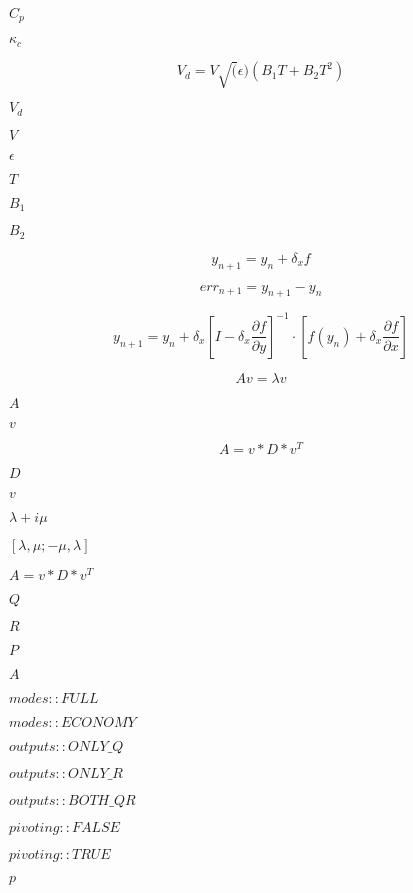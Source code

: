 \documentclass{article}
\begin{document}
$        C_p            $
\pagebreak

$        \kappa_c       $
\pagebreak

\[
    V_d = V \sqrt(\epsilon)(B_1 T + B_2 T^2)
\]
\pagebreak

$        V_d      $
\pagebreak

$        V        $
\pagebreak

$        \epsilon $
\pagebreak

$        T        $
\pagebreak

$        B_1      $
\pagebreak

$        B_2      $
\pagebreak

\[
    y_{n+1} = y_n + \delta_x f
\]
\pagebreak

\[
    err_{n+1} = y_{n+1} - y_n
\]
\pagebreak

\[
    y_{n+1} = y_n
      + \delta_x\left[I - \delta_x\frac{\partial f}{\partial y}\right]^{-1}
        \cdot \left[f(y_n) + \delta_x\frac{\partial f}{\partial x}\right]
\]
\pagebreak

\[
    A v = \lambda v
\]
\pagebreak

$      A       $
\pagebreak

$      v       $
\pagebreak

\[
        A = v*D*v^T
    \]
\pagebreak

$      D $
\pagebreak

$      v $
\pagebreak

$\lambda + i \mu$
\pagebreak

$[\lambda, \mu; -\mu, \lambda]$
\pagebreak

$A = v*D*v^T$
\pagebreak

$        Q $
\pagebreak

$        R $
\pagebreak

$        P $
\pagebreak

$        A $
\pagebreak

$        modes::FULL     $
\pagebreak

$        modes::ECONOMY  $
\pagebreak

$        outputs::ONLY\_Q     $
\pagebreak

$        outputs::ONLY\_R     $
\pagebreak

$        outputs::BOTH\_QR    $
\pagebreak

$        pivoting::FALSE     $
\pagebreak

$        pivoting::TRUE      $
\pagebreak

$        p $
\pagebreak
\end{document}
